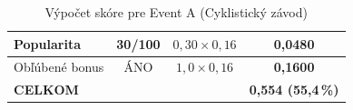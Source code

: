 \begin{table}[H]
\begin{tabular}{|l|c|c|c|}
  \hline                                                                                                                                                                                                                            
  Popularita & 30/100 & $0{,}30 \times 0{,}16$ & 0,0480 \\                                                                                                                                                                          
  \hline                                                                                                                                                                                                                            
  Obľúbené bonus & ÁNO & $1{,}0 \times 0{,}16$ & \textbf{0,1600} \\                                                                                                                                                                 
  \hline                                                                                                                                                                                                                            
  \textbf{CELKOM} & & & \textbf{0,554 (55,4\,\%)} \\                                                                                                                                                                                
  \hline                                                                                                                                                                                                                            
  \end{tabular}
  \caption{Výpočet skóre pre Event A (Cyklistický závod)}
  \end{table}

